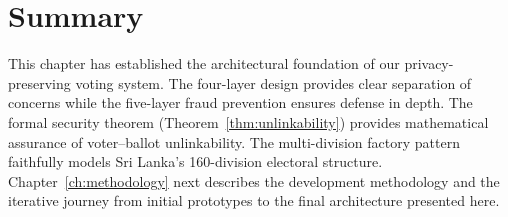 \section{Summary}

This chapter has established the architectural foundation of our privacy-preserving voting system. The four-layer design provides clear separation of concerns while the five-layer fraud prevention ensures defense in depth. The formal security theorem (Theorem~\ref{thm:unlinkability}) provides mathematical assurance of voter--ballot unlinkability. The multi-division factory pattern faithfully models Sri Lanka's 160-division electoral structure. Chapter~\ref{ch:methodology} next describes the development methodology and the iterative journey from initial prototypes to the final architecture presented here.
